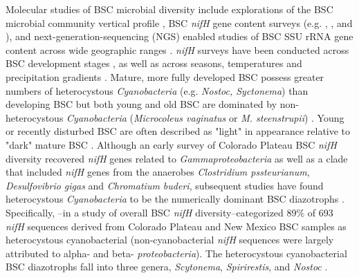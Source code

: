Molecular studies of BSC microbial diversity include explorations of the BSC
microbial community vertical profile \citep{Garcia_Pichel_2003}, BSC
\textit{nifH} gene content surveys (e.g. \citet{14766579}, \citet{Yeager_2012},
\citet{Yeager} and \citet{Steppe_1996}), and next-generation-sequencing (NGS)
enabled studies of BSC SSU rRNA gene content across wide geographic ranges
\citep{Garcia_Pichel_2013, Steven_2013}. 
\textit{nifH} surveys have been conducted across BSC development stages
\citep{14766579}, as well as across seasons, temperatures and precipitation
gradients \citep{Yeager_2012}. Mature, more fully developed BSC possess greater
numbers of heterocystous \textit{Cyanobacteria} (e.g. \textit{Nostoc,
Syctonema}) than developing BSC but both young and old BSC are dominated by
non-heterocystous \textit{Cyanobacteria} (\textit{Microcoleus vaginatus} or
\textit{M. steenstrupii}) \citep{14766579, Garcia_Pichel_2013}. Young or
recently disturbed BSC are often described as "light" in appearance relative to
"dark" mature BSC \citep{Belnap_2002, 14766579}.  Although an early survey of
Colorado Plateau BSC \textit{nifH} diversity recovered \textit{nifH} genes
related to \textit{Gammaproteobacteria} as well as a clade that included
\textit{nifH} genes from the anaerobes \textit{Clostridium pssteurianum},
\textit{Desulfovibrio gigas} and \textit{Chromatium buderi}, subsequent studies
have found heterocystous \textit{Cyanobacteria} to be the numerically dominant
BSC diazotrophs \citep{Yeager, 14766579, Yeager_2012}. Specifically,
\citet{Yeager}--in a study of overall BSC \textit{nifH} diversity--categorized
89\% of 693 \textit{nifH} sequences derived from Colorado Plateau and New
Mexico BSC samples as heterocystous cyanobacterial (non-cyanobacterial
\textit{nifH} sequences were largely attributed to alpha- and beta-
\textit{proteobacteria}). The heterocystous cyanobacterial BSC diazotrophs fall
into three genera, \textit{Scytonema}, \textit{Spirirestis}, and
\textit{Nostoc} \citep{Yeager, Yeager_2012}. 

